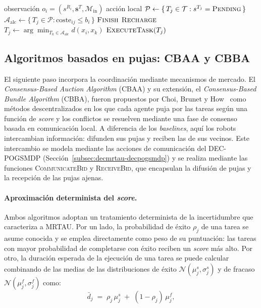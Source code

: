 \begin{algorithm}
\caption{\textsc{Greedy} --- decisión de $R_i$ en un instante de decisión}
\label{alg:greedy}
\begin{algorithmic}[1]
\Require observación $o_i=(s^{R_i},\mathbf{s}^{T},\mathcal{M}_{\mathrm{in}})$
\Ensure acción local
\State $\mathcal{P} \gets \{\,T_j \in \mathcal{T} : s^{T_j}=\textsc{Pending}\,\}$
\State $\mathcal{A}_{\mathrm{alc}} \gets \{\,T_j \in \mathcal{P} : \mathrm{coste}_{ij}\le b_i\,\}$ 
 \Return $\textsc{Finish}$
 \Return $\textsc{Recharge}$
\Else
    \State $T_j \gets \arg\min_{T_k\in\mathcal{A}_{\mathrm{alc}}} d(x_i, x_k)$ 
    \State \Return $\textsc{ExecuteTask}(T_j)$
\EndIf
\end{algorithmic}
\end{algorithm}


\subsection{Algoritmos basados en pujas: CBAA y CBBA} \label{subsec:pujas}

El siguiente paso incorpora la coordinación mediante mecanismos de mercado. El \emph{Consensus-Based Auction Algorithm} (CBAA) y su extensión, el \emph{Consensus-Based Bundle Algorithm} (CBBA), fueron propuestos por Choi, Brunet y How~\cite{choi2009consensus} como métodos descentralizados en los que cada agente puja por las tareas según una función de \emph{score} y los conflictos se resuelven mediante una fase de consenso basada en comunicación local. A diferencia de los \textit{baselines}, aquí los robots intercambian información: difunden sus pujas y reciben las de sus vecinos. Este intercambio se modela mediante las acciones de comunicación del DEC-POGSMDP (Sección~\ref{subsec:decmrtau-decpogsmdp}) y se realiza mediante las funciones \textsc{CommunicateBid} y \textsc{ReceiveBid}, que encapsulan la difusión de pujas y la recepción de las pujas ajenas.

\paragraph{Aproximación determinista del \textit{score}.} Ambos algoritmos adoptan un tratamiento determinista de la incertidumbre que caracteriza a MRTAU. Por un lado, la probabilidad de éxito $\rho_j$ de una tarea se asume conocida y se emplea directamente como peso de su puntuación: las tareas con mayor probabilidad de completarse con éxito reciben un \textit{score} más alto. Por otro, la duración esperada de la ejecución de una tarea se puede calcular combinando de las medias de las distribuciones de éxito $\mathcal{N}(\mu_j^{s},\sigma_j^{s})$ y de fracaso $\mathcal{N}(\mu_j^{f},\sigma_j^{f})$ como:
\begin{equation} \label{eq:duracion-esperada}
    \bar{d}_j \;=\; \rho_j\,\mu_j^{s} \;+\; (1-\rho_j)\,\mu_j^{f},
\end{equation}

